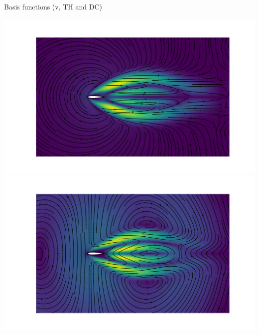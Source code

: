 \documentclass{beamer}
\begin{document}
\begin{frame}{Basis functions (v, TH and DC)}
  \begin{center}
    \includegraphics[trim={90mm 0 95mm 0},clip,height=0.95\textheight]{figs/bfun-v-no-piola-v003}
    \includegraphics[trim={90mm 0 95mm 0},clip,height=0.95\textheight]{figs/bfun-v-piola-v003}
  \end{center}
\end{frame}
\end{document}
